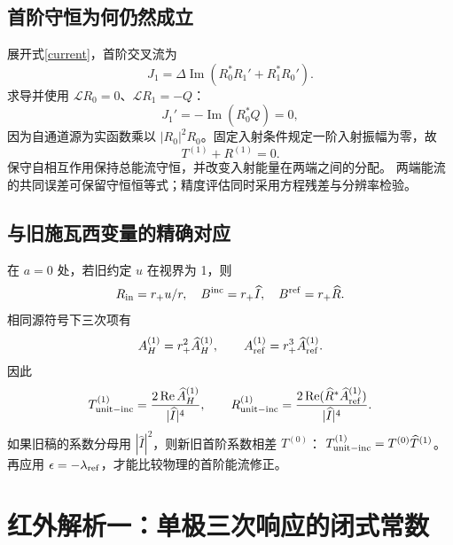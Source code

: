 \documentclass[UTF8,fontset=fandol,11pt,a4paper]{ctexart}
\newcommand{\Rea}{\operatorname{Re}}
\newcommand{\Ima}{\operatorname{Im}}
\newcommand{\Bin}{B^{\mathrm{inc}}}
\newcommand{\Bref}{B^{\mathrm{ref}}}
\newcommand{\AH}{A_H^{(1)}}
\newcommand{\Aref}{A_{\mathrm{ref}}^{(1)}}
\numberwithin{equation}{section}
\begin{document}
\subsection{首阶守恒为何仍然成立}
展开式\eqref{current}，首阶交叉流为
\begin{equation}
J_1=\Delta\Ima(R_0^*R_1'+R_1^*R_0').
\end{equation}
求导并使用 $\mathcal LR_0=0$、$\mathcal LR_1=-Q$：
\begin{equation}J_1'=-\Ima(R_0^*Q)=0,\end{equation}
因为自通道源为实函数乘以 $|R_0|^2R_0$。固定入射条件规定一阶入射振幅为零，故
\begin{equation}\boxed{T^{(1)}+R^{(1)}=0.}\end{equation}
保守自相互作用保持总能流守恒，并改变入射能量在两端之间的分配。
两端能流的共同误差可保留守恒恒等式；精度评估同时采用方程残差与分辨率检验。

\subsection{与旧施瓦西变量的精确对应}
在 $a=0$ 处，若旧约定 $u$ 在视界为 1，则
\begin{equation}
R_{\rm in}=r_+u/r,\quad\Bin=r_+\widehat I,\quad\Bref=r_+\widehat R.
\end{equation}
相同源符号下三次项有
\begin{equation}
\AH=r_+^2\widehat A_H^{(1)},\qquad\Aref=r_+^3\widehat A_{\rm ref}^{(1)}.
\end{equation}
因此
\begin{equation}
T_{\rm unit-inc}^{(1)}=\frac{2\Rea\widehat A_H^{(1)}}{|\widehat I|^4},\qquad
R_{\rm unit-inc}^{(1)}=\frac{2\Rea(\widehat R^*\widehat A_{\rm ref}^{(1)})}{|\widehat I|^4}.
\end{equation}
如果旧稿的系数分母用 $|\widehat I|^2$，则新旧首阶系数相差 $T^{(0)}$：
$T_{\rm unit-inc}^{(1)}=T^{(0)}\widehat T^{(1)}$。
再应用 $\epsilon=-\lambda_{\rm ref}$，才能比较物理的首阶能流修正。

\section{红外解析一：单极三次响应的闭式常数}
\end{document}
